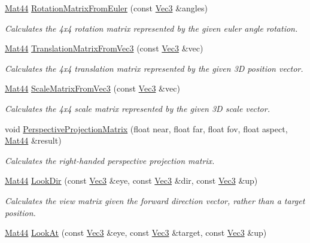 \begin{DoxyCompactItemize}
\hyperlink{classgofxmath_1_1_mat44}{Mat44} \hyperlink{namespacegofxmath_a206e53fa5ea77b54765946af3d04ca0e}{Rotation\+Matrix\+From\+Euler} (const \hyperlink{classgofxmath_1_1_vec3}{Vec3} \&angles)
\begin{DoxyCompactList}\small\item\em Calculates the 4x4 rotation matrix represented by the given euler angle rotation. \end{DoxyCompactList}\item 
\hyperlink{classgofxmath_1_1_mat44}{Mat44} \hyperlink{namespacegofxmath_a2d82d58bdc14d1f1644b05a7419ea05e}{Translation\+Matrix\+From\+Vec3} (const \hyperlink{classgofxmath_1_1_vec3}{Vec3} \&vec)
\begin{DoxyCompactList}\small\item\em Calculates the 4x4 translation matrix represented by the given 3\+D position vector. \end{DoxyCompactList}\item 
\hyperlink{classgofxmath_1_1_mat44}{Mat44} \hyperlink{namespacegofxmath_a8ec877a1635b6a682a15195b47e1f21d}{Scale\+Matrix\+From\+Vec3} (const \hyperlink{classgofxmath_1_1_vec3}{Vec3} \&vec)
\begin{DoxyCompactList}\small\item\em Calculates the 4x4 scale matrix represented by the given 3\+D scale vector. \end{DoxyCompactList}\item 
void \hyperlink{namespacegofxmath_a8aa599fb24b0a8ce16acf8092ee29478}{Perspective\+Projection\+Matrix} (float near, float far, float fov, float aspect, \hyperlink{classgofxmath_1_1_mat44}{Mat44} \&result)
\begin{DoxyCompactList}\small\item\em Calculates the right-\/handed perspective projection matrix. \end{DoxyCompactList}\item 
\hyperlink{classgofxmath_1_1_mat44}{Mat44} \hyperlink{namespacegofxmath_a1d0cf66e3877d2be1e104bbacec0c917}{Look\+Dir} (const \hyperlink{classgofxmath_1_1_vec3}{Vec3} \&eye, const \hyperlink{classgofxmath_1_1_vec3}{Vec3} \&dir, const \hyperlink{classgofxmath_1_1_vec3}{Vec3} \&up)
\begin{DoxyCompactList}\small\item\em Calculates the view matrix given the forward direction vector, rather than a target position. \end{DoxyCompactList}\item 
\hyperlink{classgofxmath_1_1_mat44}{Mat44} \hyperlink{namespacegofxmath_ac420c9cd578ebe0b21c9db7757bc4c2d}{Look\+At} (const \hyperlink{classgofxmath_1_1_vec3}{Vec3} \&eye, const \hyperlink{classgofxmath_1_1_vec3}{Vec3} \&target, const \hyperlink{classgofxmath_1_1_vec3}{Vec3} \&up)

\end{DoxyCompactItemize}
